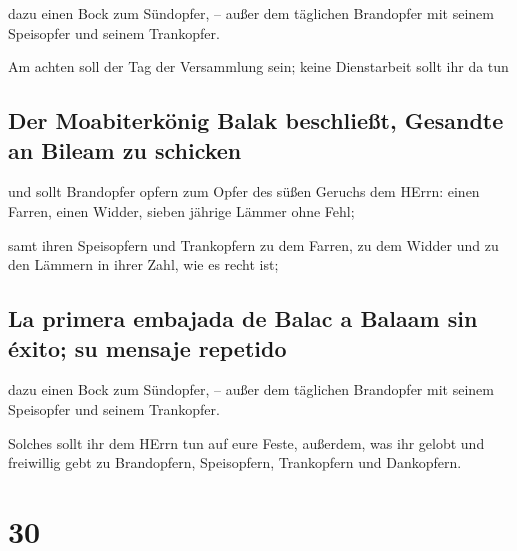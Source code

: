  dazu einen Bock zum Sündopfer, -- außer dem täglichen
Brandopfer mit seinem Speisopfer und seinem Trankopfer.

 Am achten soll der Tag der Versammlung sein; keine
Dienstarbeit sollt ihr da tun

\hypertarget{der-moabiterkuxf6nig-balak-beschlieuxdft-gesandte-an-bileam-zu-schicken}{%
\subsection{Der Moabiterkönig Balak beschließt, Gesandte an Bileam zu
schicken}\label{der-moabiterkuxf6nig-balak-beschlieuxdft-gesandte-an-bileam-zu-schicken}}

 und sollt Brandopfer opfern zum Opfer des süßen Geruchs
dem HErrn: einen Farren, einen Widder, sieben jährige Lämmer ohne Fehl;

 samt ihren Speisopfern und Trankopfern zu dem Farren, zu
dem Widder und zu den Lämmern in ihrer Zahl, wie es recht ist;

\hypertarget{la-primera-embajada-de-balac-a-balaam-sin-uxe9xito-su-mensaje-repetido}{%
\subsection{La primera embajada de Balac a Balaam sin éxito; su mensaje
repetido}\label{la-primera-embajada-de-balac-a-balaam-sin-uxe9xito-su-mensaje-repetido}}

 dazu einen Bock zum Sündopfer, -- außer dem täglichen
Brandopfer mit seinem Speisopfer und seinem Trankopfer.

 Solches sollt ihr dem HErrn tun auf eure Feste,
außerdem, was ihr gelobt und freiwillig gebt zu Brandopfern,
Speisopfern, Trankopfern und Dankopfern.

\hypertarget{section-29}{%
\section{30}\label{section-29}}

